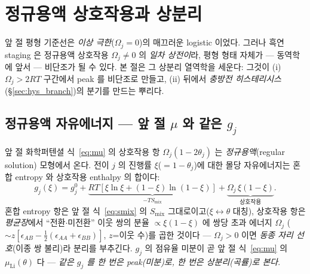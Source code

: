\documentclass[11pt,a4paper]{article}
\begin{document}
\section{정규용액 상호작용과 상분리}\label{sec:regsol}
앞 절 평형 기준선은 \emph{이상 극한}($\Omega_j=0$)의 매끄러운 logistic 이었다. 그러나 흑연 staging 은 정규용액
상호작용 $\Omega_j\ne0$ 의 \emph{일차 상전이}라, 평형 형태 자체가 — 동역학에 앞서 — 비단조가 될 수 있다. 본 절은
그 상분리 열역학을 세운다: 그것이 (i) $\Omega_j>2RT$ 구간에서 peak 를 비단조로 만들고, (ii) 뒤에서 \emph{충방전
히스테리시스}(\S\ref{sec:hys_branch})의 분기를 만드는 뿌리다.

\subsection{정규용액 자유에너지 — 앞 절 $\mu$ 와 같은 $g_j$}
앞 절 화학퍼텐셜 식~\eqref{eq:mu} 의 상호작용 항 $\Omega_j(1-2\theta_j)$ 는 \emph{정규용액}(regular solution)
모형에서 온다. 전이 $j$ 의 진행률 $\xi$($=1-\theta_j$)에 대한 몰당 자유에너지는 혼합 entropy 와 상호작용 enthalpy
의 합이다:
\begin{equation}
g_j(\xi)=g_j^0+\underbrace{RT[\xi\ln\xi+(1-\xi)\ln(1-\xi)]}_{-T S_\mathrm{mix}}
+\underbrace{\Omega_j\,\xi(1-\xi)}_{\text{상호작용}}.
\label{eq:regsol_g}
\end{equation}
혼합 entropy 항은 앞 절 식~\eqref{eq:smix} 의 $S_\mathrm{mix}$ 그대로이고($\xi\leftrightarrow\theta$ 대칭), 상호작용
항은 \emph{평균장}에서 ``전환$\cdot$미전환'' 이웃 쌍의 분율 $\propto\xi(1-\xi)$ 에 쌍당 초과 에너지 $\Omega_j$
($\sim z[\epsilon_{AB}-\tfrac12(\epsilon_{AA}+\epsilon_{BB})]$, $z$=이웃 수)를 곱한 것이다 — $\Omega_j>0$ 이면
\emph{동종 자리 선호}(이종 쌍 불리)라 분리를 부추긴다. $g_j$ 의 점유율 미분이 곧 앞 절 식~\eqref{eq:mu} 의
$\mu_\mathrm{Li}(\theta)$ 다 — \emph{같은 $g_j$ 를 한 번은 peak(미분)로, 한 번은 상분리(곡률)로 본다}.
\end{document}
